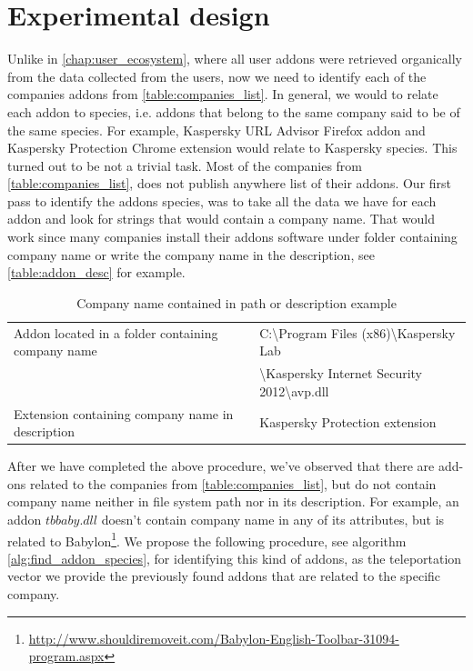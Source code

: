 \documentclass[11pt,oneside]{book}
\let\Oldsection\section
\renewcommand{\section}{\FloatBarrier\Oldsection}
\begin{document}
{{{{\section{Experimental design}
Unlike in \autoref{chap:user_ecosystem}, where all user addons were retrieved organically from the data collected from the users, now we need to identify each of the companies addons from \autoref{table:companies_list}. In general, we would to relate each addon to species, i.e. addons that belong to the same company said to be of the same species. For example, Kaspersky URL Advisor Firefox addon and Kaspersky Protection Chrome extension would relate to Kaspersky species. This turned out to be not a trivial task. Most of the companies from \autoref{table:companies_list}, does not publish anywhere list of their addons. Our first pass to identify the addons species, was to take all the data we have for each addon and look for strings that would contain a company name. That would work since many companies install their addons software under folder containing company name or write the company name in the description, see \autoref{table:addon_desc} for example.

\begin{table}[h]
\centering
\caption{Company name contained in path or description example}
\label{table:addon_desc}
\begin{tabular}{@{}|l|l|@{}}
\toprule
Addon located in a folder containing company name & C:\textbackslash{Program Files (x86)}\textbackslash{Kaspersky Lab}\\ & \textbackslash{Kaspersky Internet Security 2012}\textbackslash{avp.dll} \\ \midrule
Extension containing company name in description & Kaspersky Protection extension \\ \bottomrule
\end{tabular}
\end{table}

After we have completed the above procedure, we've observed that there are add-ons related to the companies from \autoref{table:companies_list}, but do not contain company name neither in file system path nor in its description. For example, an addon $tbbaby.dll$ doesn't contain company name in any of its attributes, but is related to Babylon\footnote{\url{http://www.shouldiremoveit.com/Babylon-English-Toolbar-31094-program.aspx}}. 
We propose the following procedure, see algorithm \autoref{alg:find_addon_species}, for identifying this kind of addons, as the teleportation vector we provide the previously found addons that are related to the specific company.

}}}}
\end{document}
